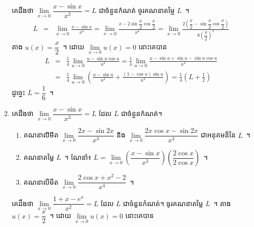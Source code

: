 \documentclass[a5paper,leqno,fleqn]{book}
\begin{document}
\begin{enumerate}
\begin{enumerate}
	\end{enumerate}
	\begin{example}{}{}
		គេដឹងថា $ \lim\limits_{x\to0}\dfrac{x-\sin x}{x^3}=L $ ជាចំនួនកំណត់ ចូរគណនាតម្លៃ $ L $~។
		\begin{eqnarray*}
		L&=&\lim_{x\to 0}\frac{x-\sin x}{x^3}
		=\lim_{x\to 0}\frac{x-2\sin\dfrac{x}{2}\cos\dfrac{x}{2}}{x^3}
		=\lim_{x\to 0}\frac{2\left(\dfrac{x}{2}-\sin\dfrac{x}{2}\cos\dfrac{x}{2}\right)}{8\left(\dfrac{x}{2}\right)^3}
		\end{eqnarray*}
		តាង $ u(x)=\dfrac{x}{2} $~។ ដោយ $ \lim\limits_{x\to 0}u(x)=0 $ នោះគេបាន
		\begin{eqnarray*}
		L&=&\frac{1}{4}\lim_{u\to 0}\frac{u-\sin u\cos u}{u^3}
		=\frac{1}{4}\lim_{u\to 0}\frac{u-\sin u+\sin u-\sin u\cos u}{u^3}\\
		&=&\frac{1}{4}\lim_{u\to 0}\left(\frac{u-\sin u}{u^3}+\frac{(1-\cos u)\sin u}{u^3}\right)
		=\frac{1}{4}\left(L+\frac{1}{2}\right)
		\end{eqnarray*}
		ដូច្នេះ $ L=\dfrac{1}{6} $~។
	\end{example}
	\item គេដឹងថា $ \lim\limits_{x\to0}\dfrac{x-\sin x}{x^3}=L $ ដែល $ L $ ជាចំនួនកំណត់។
	\begin{enumerate}
		\item គណនាលីមីត $ \lim\limits_{x\to0}\dfrac{2x-\sin2x}{x^3} $ និង $ \lim\limits_{x\to0}\dfrac{2x\cos x-\sin2x}{x^3} $ ជាអនុគមន៏នៃ $ L $~។
		\item គណនាតម្លៃ $ L $~។ ណែនាំ៖ $  L=\lim\limits_{x\to0}\left(\dfrac{x-\sin x}{x^3}\right)\left(\dfrac{2\cos x}{2\cos x}\right) $~។
		\item គណនាលីមីត $ \lim\limits_{x\to0}\dfrac{2\cos x+x^2-2}{x^4} $~។
	\end{enumerate}
	\begin{example}{}{}
		គេដឹងថា $ \lim\limits_{x\to0}\dfrac{1+x-e^x}{x^2}=L $ ដែល $ L $ ជាចំនួនកំណត់។ ចូរគណនាតម្លៃ $ L $~។
		តាង $ u(x)=\dfrac{x}{2} $~។ ដោយ $ \lim\limits_{x\to 0}u(x)=0 $ នោះគេបាន
		\begin{eqnarray*}

\end{eqnarray*}
\end{example}
\end{enumerate}
\end{document}
